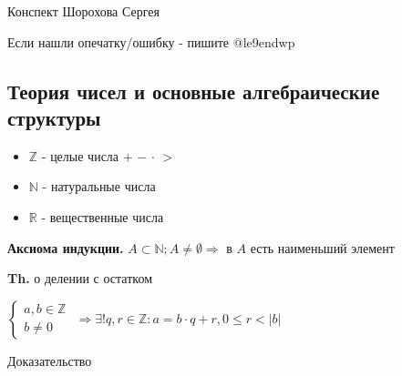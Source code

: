 \documentclass[14pt, letter paper]{article}
\begin{document}
\begin{flushright}
    Конспект Шорохова Сергея

    Если нашли опечатку/ошибку - пишите @le9endwp
\end{flushright}

\begin{center}
    \section*{Теория чисел и основные алгебраические структуры}
\end{center}

\begin{itemize}
    \item $\mathbb{Z}$ - целые числа $+$ $-$ $\cdot$ $>$
    \item $\mathbb{N}$ - натуральные числа
    \item $\mathbb{R}$ - вещественные числа
\end{itemize}

\textbf{Аксиома индукции.} $A \subset \mathbb{N}; A \neq \emptyset \Rightarrow$ в $A$ есть наименьший элемент

\textbf{Th.} о делении с остатком

$\begin{cases}
    a, b \in \mathbb{Z} \\
    b \neq 0
\end{cases}$
$\Rightarrow \exists ! q, r \in \mathbb{Z}: a = b \cdot q + r, 0 \leq r < |b|$

\begin{center}
    Доказательство
\end{center}
\end{document}
